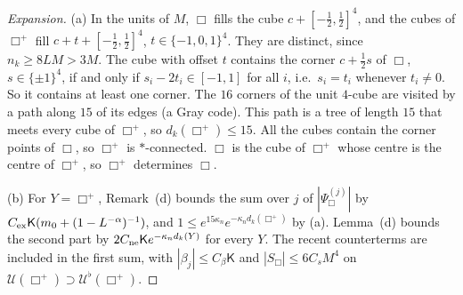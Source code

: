 \begin{proof}[Expansion]
(a) In the units of $M$, $\Box$ fills the cube $c+[-\frac12,\frac12]^4$, and the cubes of $\Box^+$ fill $c+t+[-\frac12,\frac12]^4$, $t\in\{-1,0,1\}^4$. They are distinct, since $n_k\ge8LM>3M$. The cube with offset $t$ contains the corner $c+\frac12s$ of $\Box$, $s\in\{\pm1\}^4$, if and only if $s_i-2t_i\in[-1,1]$ for all $i$, i.e.\ $s_i=t_i$ whenever $t_i\ne0$. So it contains at least one corner. The $16$ corners of the unit $4$-cube are visited by a path along $15$ of its edges (a Gray code). This path is a tree of length $15$ that meets every cube of $\Box^+$, so $d_k(\Box^+)\le15$. All the cubes contain the corner points of $\Box$, so $\Box^+$ is $*$-connected. $\Box$ is the cube of $\Box^+$ whose centre is the centre of $\Box^+$, so $\Box^+$ determines $\Box$.

(b) For $Y=\Box^+$, Remark~(d) bounds the sum over $j$ of $|\Psi^{(j)}_\Box|$ by $C_{\rm ex}\mathsf K(m_0+(1-L^{-\alpha})^{-1})$, and $1\le e^{15\kappa_n}e^{-\kappa_nd_k(\Box^+)}$ by (a). Lemma~(d) bounds the second part by $2C_{\rm ne}\mathsf Ke^{-\kappa_nd_k(Y)}$ for every $Y$. The recent counterterms are included in the first sum, with $|\beta_j|\le C_\beta\mathsf K$ and $|S_\Box|\le6C_sM^4$ on $\mathcal U(\Box^+)\supset\mathcal U^\flat(\Box^+)$.


\end{proof}
